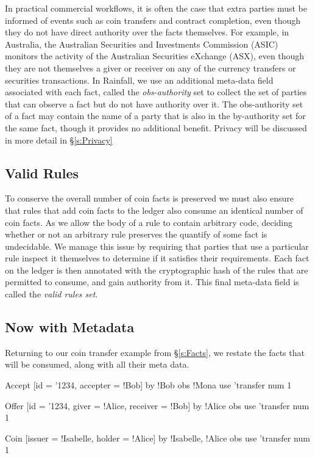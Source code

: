 In practical commercial workflows, it is often the case that extra parties must be informed of events such as coin transfers and contract completion, even though they do not have direct authority over the facts themselves. For example, in Australia, the Australian Securities and Investments Commission (ASIC) monitors the activity of the Australian Securities eXchange (ASX), even though they are not themselves a giver or receiver on any of the currency transfers or securities transactions. In Rainfall, we use an additional meta-data field associated with each fact, called the \emph{obs-authority} set to collect the set of parties that can observe a fact but do not have authority over it. The obs-authority set of a fact may contain the name of a party that is also in the by-authority set for the same fact, though it provides no additional benefit. Privacy will be discussed in more detail in \S\ref{s:Privacy}


\subsection{Valid Rules}
To conserve the overall number of coin facts is preserved we must also ensure that rules that add coin facts to the ledger also consume an identical number of coin facts. As we allow the body of a rule to contain arbitrary code, deciding whether or not an arbitrary rule preserves the quantify of some fact is undecidable. We manage this issue by requiring that parties that use a particular rule inspect it themselves to determine if it satisfies their requirements. Each fact on the ledger is then annotated with the cryptographic hash of the rules that are permitted to consume, and gain authority from it. This final meta-data field is called the \emph{valid rules set}.


\subsection{Now with Metadata}

Returning to our coin transfer example from \S\ref{s:Facts}, we restate the facts that will be consumed, along with all their meta data.

\begin{small}
\begin{code}
 Accept [id = '1234, accepter = !Bob]
    by  {!Bob}                obs {!Mona}
    use {'transfer}           num 1

 Offer  [id = '1234, giver = !Alice, receiver = !Bob]
    by  {!Alice}              obs {}
    use {'transfer}           num 1

 Coin   [issuer = !Isabelle, holder  = !Alice]
    by  {!Isabelle, !Alice}   obs {}
    use {'transfer}           num 1
\end{code}
\end{small}

